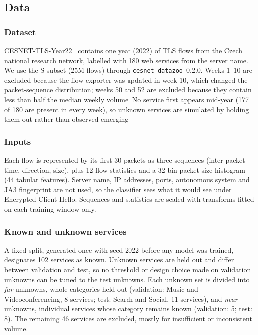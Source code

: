 \documentclass[journal]{IEEEtran}
\begin{document}
\subsection{Data}

\subsubsection*{Dataset}
CESNET-TLS-Year22~\cite{luxemburk2024year22} contains one year (2022) of TLS flows from the Czech national research network, labelled with 180 web services from the server name. We use the S subset (25M flows) through \texttt{cesnet-datazoo}~0.2.0. Weeks 1--10 are excluded because the flow exporter was updated in week 10, which changed the packet-sequence distribution; weeks 50 and 52 are excluded because they contain less than half the median weekly volume. No service first appears mid-year (177 of 180 are present in every week), so unknown services are simulated by holding them out rather than observed emerging.

\subsubsection*{Inputs}
Each flow is represented by its first 30 packets as three sequences (inter-packet time, direction, size), plus 12 flow statistics and a 32-bin packet-size histogram (44 tabular features). Server name, IP addresses, ports, autonomous system and JA3 fingerprint are not used, so the classifier sees what it would see under Encrypted Client Hello. Sequences and statistics are scaled with transforms fitted on each training window only.

\subsubsection*{Known and unknown services}
A fixed split, generated once with seed 2022 before any model was trained, designates 102 services as known. Unknown services are held out and differ between validation and test, so no threshold or design choice made on validation unknowns can be tuned to the test unknowns. Each unknown set is divided into \emph{far} unknowns, whole categories held out (validation: Music and Videoconferencing, 8 services; test: Search and Social, 11 services), and \emph{near} unknowns, individual services whose category remains known (validation: 5; test: 8). The remaining 46 services are excluded, mostly for insufficient or inconsistent volume.
\end{document}
